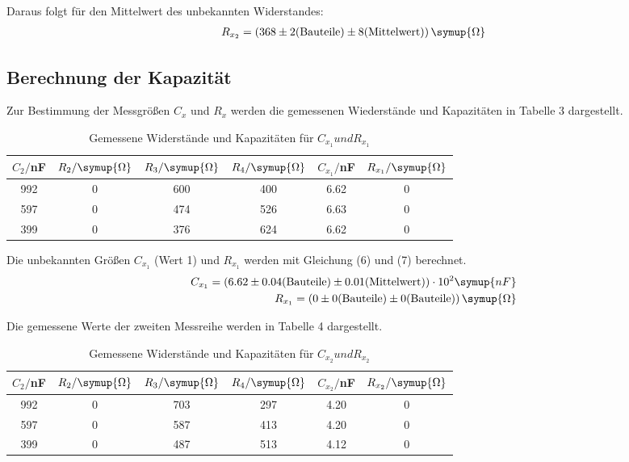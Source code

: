 Daraus folgt für den Mittelwert des unbekannten Widerstandes:
\begin{align*}
  R_{x_2} = (368 \pm 2\text{(Bauteile)} \pm 8\text{(Mittelwert)}) \, \symup{\Omega}
\end{align*}


\subsection{Berechnung der Kapazität}
Zur Bestimmung der Messgrößen $C_x$ und $R_x$ werden die gemessenen Wiederstände und Kapazitäten in
Tabelle 3 dargestellt.

\begin{table}[H]
  \centering
  \caption{Gemessene Widerstände und Kapazitäten für $C_{x_1} und R_{x_1}$}
  \label{tab:Widerstand}
  \begin{tabular}{c c c c c c}
    \toprule
    $C_2/$nF & $R_2/ \symup{\Omega}$ & $R_3/ \symup{\Omega}$ & $R_4 / \symup{\Omega}$ & $C_{x_1}/$nF & $R_{x_1} / \symup{\Omega}$\\
    \midrule
    992 & 0 & 600 & 400 & 6.62  & 0\\
    597 & 0 & 474 & 526 & 6.63  & 0\\
    399 & 0 & 376 & 624 & 6.62  & 0\\
    \bottomrule
  \end{tabular}
\end{table}

Die unbekannten Größen $C_{x_1}$ (Wert 1) und $R_{x_1}$ werden mit Gleichung (6) und (7) berechnet.
\begin{align*}
  C_{x_1} = (6.62 \pm 0.04\text{(Bauteile)} \pm 0.01\text{(Mittelwert)}) \cdot 10^{2} \symup{nF} \\
  R_{x_1} = (0 \pm 0\text{(Bauteile)} \pm 0\text{(Bauteile)}) \, \symup{\Omega}
\end{align*}

Die gemessene Werte der zweiten Messreihe werden in Tabelle 4 dargestellt.

\begin{table}[H]
  \centering
  \caption{Gemessene Widerstände und Kapazitäten für $C_{x_2} und R_{x_2}$}
  \label{tab:Widerstand}
  \begin{tabular}{c c c c c c}
    \toprule
    $C_2/$nF & $R_2/ \symup{\Omega}$ & $R_3/ \symup{\Omega}$ & $R_4 / \symup{\Omega}$ & $C_{x_2}/$nF &  $R_{x_2} / \symup{\Omega}$\\
    \midrule
    992 & 0 & 703 & 297 &  4.20 & 0\\
    597 & 0 & 587 & 413 &  4.20 & 0\\
    399 & 0 & 487 & 513 &  4.12 & 0\\
    \bottomrule
  \end{tabular}
\end{table}

